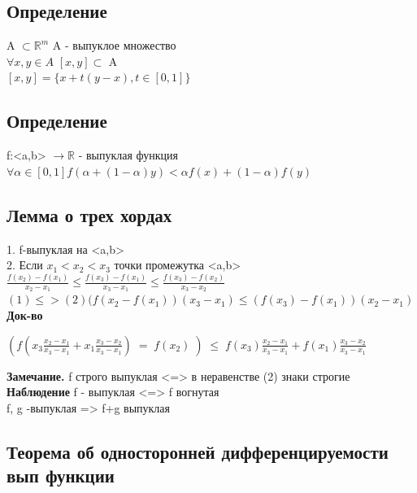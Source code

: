 \documentclass[12pt, a4paper]{article}
\begin{document}
	\subsection{Определение}
	A $\subset \mathbb{R}^m$ A - выпуклое множество \\
	$\forall x, y \in A$  $[x,y] \subset$ A \\
	$[x,y]=\lbrace x+t(y-x), t \in [0,1] \rbrace$ \\
	
	\subsection{Определение}
	f:<a,b> $\rightarrow \mathbb{R}$ - выпуклая функция \\
	$\forall \alpha \in [0,1] f (\alpha + (1-\alpha)y)< \alpha f(x) + (1-\alpha)f(y)$ \\
	
	\subsection{Лемма о трех хордах}
	1. f-выпуклая на <a,b> \\
	2. Если $x_{1} < x_{2} < x_{3}$  точки промежутка <a,b> \\
	$ \frac{f(x_2)-f(x_1)}{x_2-x_1}\leq\frac{\displaystyle f(x_3)-f(x_1)}{\displaystyle x_3-x_1}\leq\frac{\displaystyle f(x_3)-f(x_2)}{\displaystyle x_3-x_2}$ \\
	$(1) \leqslant> (2) (f(x_2-f(x_1))(x_3 -x_1) \leq (f(x_3)-f(x_{1}))(x_{2}-x_{1})$ \\
	
	\textbf{Док-во}
	
	$(f(x_3\frac{x_2-x_1}{x_3-x_1}+x_1\frac{x_3-x_2}{x_3-x_1})\;=\;f(x_2)\;)\;\leq\;f(x_3)\frac{x_2-x_1}{x_3-x_1}+f(x_1)\frac{x_3-x_2}{x_3-x_1}$
	
	\textbf{Замечание.} 
	f строго выпуклая <=> в неравенстве (2) знаки строгие \\
	\textbf{Наблюдение} f - выпуклая <=> f вогнутая \\
	f, g -выпуклая => f+g выпуклая 
	
	\subsection{Теорема об односторонней дифференцируемости вып функции}
	
\end{document}
